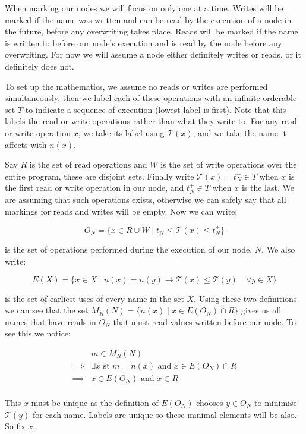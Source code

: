\documentclass[twoside,a4paper]{report}
\begin{document}
When marking our nodes we will focus on only one at a time. Writes will be marked if the name was written and can be read by the execution of a node in the
future, before any overwriting takes place. Reads will be marked if the name is written to before our node's execution and is read by the node before any
overwriting. For now we will assume a node either definitely writes or reads, or it definitely does not.

To set up the mathematics, we assume no reads or writes are performed simultaneously, then we label each of these operations with an infinite orderable set $T$ to
indicate a sequence of execution (lowest label is first). Note that this labels the read or write operations rather than what they write to. For any read or
write operation $x$, we take its label using $\mathcal{T}(x)$, and we take the name it affects with $n(x)$.

Say $R$ is the set of read operations and $W$ is the set of write operations over the entire program, these are disjoint sets. Finally write
$\mathcal{T}(x) = t^{-}_N \in T$ when $x$ is the first read or write operation in our node, and $t^{+}_N \in T$ when $x$ is the last. We are
assuming that such operations exists, otherwise we can safely say that all markings for reads and writes will be empty. Now we can write:

$$O_N = \{x \in R \cup W \mid t^{-}_N \le \mathcal{T}(x) \le t^+_N \}$$

is the set of operations performed during the execution of our node, $N$. We also write:

$$E(X) = \{x \in X \mid n(x) = n(y) \rightarrow \mathcal{T}(x) \le \mathcal{T}(y) \quad \forall y \in X \}$$

is the set of earliest uses of every name in the set $X$. Using these two definitions we can see that the set $M_R(N) = \{n(x) \mid x \in E(O_N) \cap R \}$ gives us
all names that have reads in $O_N$ that must read values written before our node. To see this we notice:

\begin{align*}
         & m \in M_R(N) \\
\implies & \exists x \text{ st } m = n(x) \text{ and } x \in E(O_N) \cap R \\
\implies & x \in  E(O_N) \text{ and } x \in R \\
\end{align*}

This $x$ must be unique as the definition of $E(O_N)$ chooses $y \in O_N$ to minimise $\mathcal{T}(y)$ for each name. Labels are unique so these minimal elements
will be also. So fix $x$.
\end{document}
